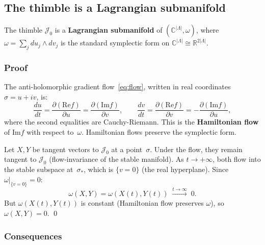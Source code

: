 \documentclass[12pt]{article}
\theoremstyle{definition}
\theoremstyle{remark}
\newcommand{\R}{\mathbb{R}}
\newcommand{\C}{\mathbb{C}}
\newcommand{\La}{\Lambda}
\newcommand{\im}{\mathrm{Im}}
\newcommand{\re}{\mathrm{Re}}
\begin{document}
\subsection{The thimble is a Lagrangian submanifold}
\label{sec:lagrangian}

The thimble $\mathcal{J}_0$ is a \textbf{Lagrangian submanifold}
of $(\C^{|\La|},\omega)$, where
$\omega = \sum_j du_j \wedge dv_j$ is the standard symplectic form
on $\C^{|\La|} \cong \R^{2|\La|}$.

\subsubsection{Proof}

The anti-holomorphic gradient flow~\eqref{eq:flow}, written in
real coordinates $\sigma = u + iv$, is:
\begin{equation}
  \frac{du}{dt} = \frac{\partial(\re f)}{\partial u}
    = \frac{\partial(\im f)}{\partial v}, \qquad
  \frac{dv}{dt} = \frac{\partial(\re f)}{\partial v}
    = -\frac{\partial(\im f)}{\partial u},
\end{equation}
where the second equalities are Cauchy-Riemann. This is the
\textbf{Hamiltonian flow} of $\im f$ with respect to~$\omega$.
Hamiltonian flows preserve the symplectic form.

Let $X, Y$ be tangent vectors to $\mathcal{J}_0$ at a point~$\sigma$.
Under the flow, they remain tangent to $\mathcal{J}_0$
(flow-invariance of the stable manifold). As $t \to +\infty$,
both flow into the stable subspace at~$\sigma_*$, which is
$\{v = 0\}$ (the real hyperplane). Since
$\omega|_{\{v=0\}} = 0$:
\begin{equation}
  \omega(X,Y) = \omega(X(t),Y(t)) \;\xrightarrow{t\to\infty}\; 0.
\end{equation}
But $\omega(X(t),Y(t))$ is constant (Hamiltonian flow preserves
$\omega$), so $\omega(X,Y) = 0$. \qed

\subsubsection{Consequences}
\end{document}
